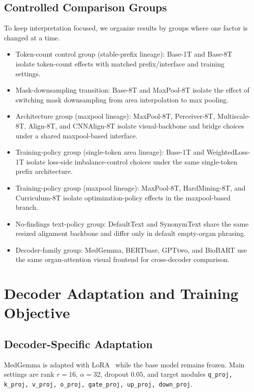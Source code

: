 \subsection{Controlled Comparison Groups}
To keep interpretation focused, we organize results by groups where one factor is changed at a time.
\begin{itemize}
    \item Token-count control group (stable-prefix lineage): Base-1T and Base-8T isolate token-count effects with matched prefix/interface and training settings.
    \item Mask-downsampling transition: Base-8T and MaxPool-8T isolate the effect of switching mask downsampling from area interpolation to max pooling.
    \item Architecture group (maxpool lineage): MaxPool-8T, Perceiver-8T, Multiscale-8T, Align-8T, and CNNAlign-8T isolate visual-backbone and bridge choices under a shared maxpool-based interface.
    \item Training-policy group (single-token area lineage): Base-1T and WeightedLoss-1T isolate loss-side imbalance-control choices under the same single-token prefix architecture.
    \item Training-policy group (maxpool lineage): MaxPool-8T, HardMining-8T, and Curriculum-8T isolate optimization-policy effects in the maxpool-based branch.
    \item No-findings text-policy group: DefaultText and SynonymText share the same resized alignment backbone and differ only in default empty-organ phrasing.
    \item Decoder-family group: MedGemma, \ac{BERTbase}, \ac{GPTtwo}, and BioBART use the same organ-attention visual frontend for cross-decoder comparison.
\end{itemize}

\section{Decoder Adaptation and Training Objective}\label{sec:method_decoder_objective}
\subsection{Decoder-Specific Adaptation}
MedGemma is adapted with LoRA~\cite{hu2022lora} while the base model remains frozen. Main settings are rank $r=16$, $\alpha=32$, dropout $0.05$, and target modules
\texttt{q\_proj, k\_proj, v\_proj, o\_proj, gate\_proj, up\_proj, down\_proj}.

